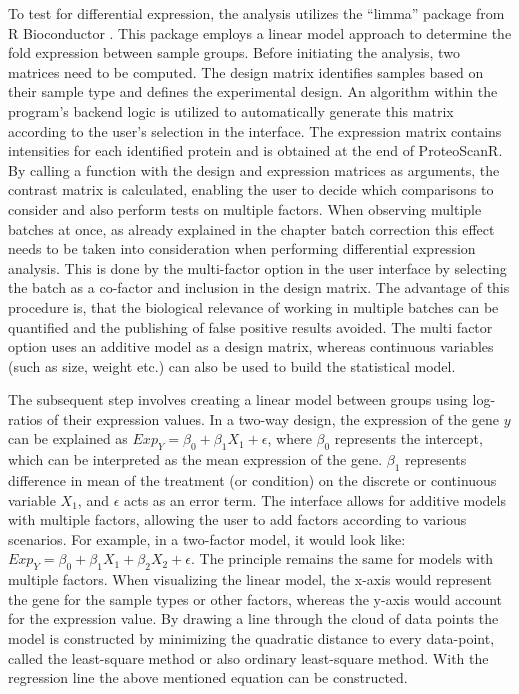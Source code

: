 \documentclass[
  11pt,
]{article}
\begin{document}
To test for differential expression, the analysis utilizes the ``limma'' package from R Bioconductor \citep{Phipson2016}. This package employs a linear model approach to determine the fold expression between sample groups. Before initiating the analysis, two matrices need to be computed. The design matrix identifies samples based on their sample type and defines the experimental design. An algorithm within the program's backend logic is utilized to automatically generate this matrix according to the user's selection in the interface. The expression matrix contains intensities for each identified protein and is obtained at the end of ProteoScanR. By calling a function with the design and expression matrices as arguments, the contrast matrix is calculated, enabling the user to decide which comparisons to consider and also perform tests on multiple factors. When observing multiple batches at once, as already explained in the chapter batch correction this effect needs to be taken into consideration when performing differential expression analysis. This is done by the multi-factor option in the user interface by selecting the batch as a co-factor and inclusion in the design matrix. The advantage of this procedure is, that the biological relevance of working in multiple batches can be quantified and the publishing of false positive results avoided.
The multi factor option uses an additive model as a design matrix, whereas continuous variables (such as size, weight etc.) can also be used to build the statistical model.

The subsequent step involves creating a linear model between groups using log-ratios of their expression values. In a two-way design, the expression of the gene \(y\) can be explained as \(Exp_{Y} = \beta_{0} + \beta_{1}X_{1} + \epsilon\), where \(\beta_0\) represents the intercept, which can be interpreted as the mean expression of the gene. \(\beta_1\) represents difference in mean of the treatment (or condition) on the discrete or continuous variable \(X_{1}\), and \(\epsilon\) acts as an error term. The interface allows for additive models with multiple factors, allowing the user to add factors according to various scenarios. For example, in a two-factor model, it would look like: \(Exp_{Y} = \beta_{0} + \beta_{1}X_{1} + \beta_{2}X_{2} + \epsilon\). The principle remains the same for models with multiple factors. When visualizing the linear model, the x-axis would represent the gene for the sample types or other factors, whereas the y-axis would account for the expression value. By drawing a line through the cloud of data points the model is constructed by minimizing the quadratic distance to every data-point, called the least-square method or also ordinary least-square method. With the regression line the above mentioned equation can be constructed.
\end{document}
